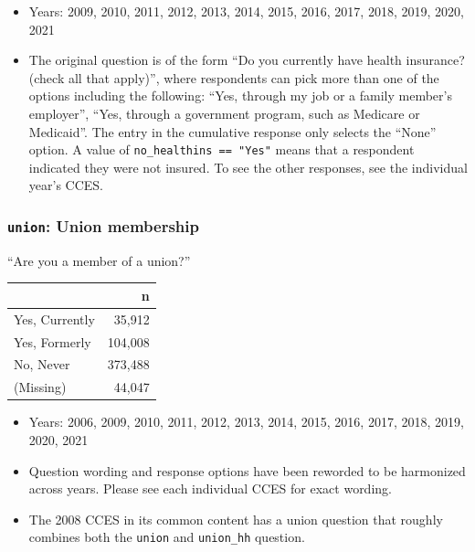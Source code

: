 \documentclass[10pt,article,oneside]{memoir}
\theoremstyle{definition}
\begin{document}
\begin{itemize}
\tightlist
\item
  Years: 2009, 2010, 2011, 2012, 2013, 2014, 2015, 2016, 2017, 2018,
  2019, 2020, 2021
\item
  The original question is of the form ``Do you currently have health
  insurance? (check all that apply)'', where respondents can pick more
  than one of the options including the following: ``Yes, through my job
  or a family member's employer'', ``Yes, through a government program,
  such as Medicare or Medicaid''. The entry in the cumulative response
  only selects the ``None'' option. A value of
  \texttt{no\_healthins\ ==\ "Yes"} means that a respondent indicated
  they were not insured. To see the other responses, see the individual
  year's CCES.
\end{itemize}

\hypertarget{union-union-membership}{%
\subsubsection{\texorpdfstring{\texttt{union}: Union
membership}{union: Union membership}}\label{union-union-membership}}

``Are you a member of a union?''

\begin{table}[H]
\centering
\begin{tabular}[t]{lr}
\toprule
 & n\\
\midrule
Yes, Currently & 35,912\\
Yes, Formerly & 104,008\\
No, Never & 373,488\\
(Missing) & 44,047\\
\bottomrule
\end{tabular}
\end{table}

\begin{itemize}
\tightlist
\item
  Years: 2006, 2009, 2010, 2011, 2012, 2013, 2014, 2015, 2016, 2017,
  2018, 2019, 2020, 2021
\item
  Question wording and response options have been reworded to be
  harmonized across years. Please see each individual CCES for exact
  wording.
\item
  The 2008 CCES in its common content has a union question that roughly
  combines both the \texttt{union} and \texttt{union\_hh} question.
\end{itemize}
\end{document}
